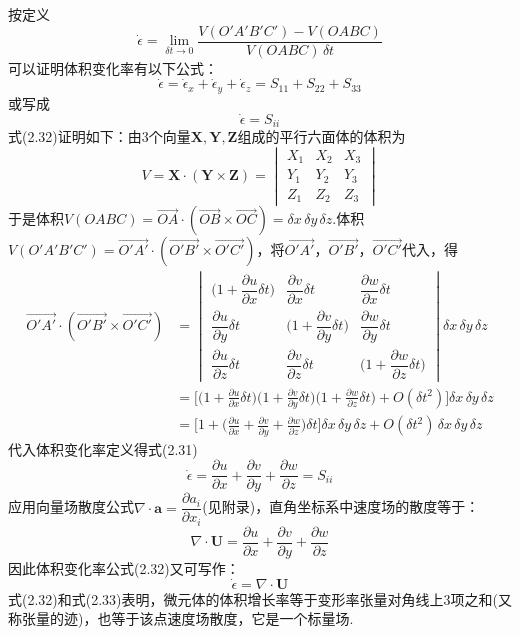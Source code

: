 按定义
\begin{equation*}
\dot{\epsilon}=\lim_{\delta t\to 0}\frac{V(O'A'B'C')-V(OABC)}{V(OABC)\,\delta t}
\tag{2.31}
\end{equation*}
可以证明体积变化率有以下公式：
\[
\dot{\epsilon}=\dot{\epsilon}_x+\dot{\epsilon}_y+\dot{\epsilon}_z=S_{11}+S_{22}+S_{33}
\]
或写成
\begin{equation*}
\dot{\epsilon}=S_{ii}
\tag{2.32}
\end{equation*}
式(2.32)证明如下：由3个向量$\boldsymbol{X},\boldsymbol{Y},\boldsymbol{Z}$组成的平行六面体的体积为
\[
V=\boldsymbol{X}\cdot(\boldsymbol{Y}\times\boldsymbol{Z})=\begin{vmatrix}
X_1 & X_2 & X_3\\
Y_1 & Y_2 & Y_3\\
Z_1 & Z_2 & Z_3
\end{vmatrix}
\]
于是体积$V(OABC)=\overrightarrow{OA}\cdot(\overrightarrow{OB}\times\overrightarrow{OC})=\delta x\,\delta y\,\delta z$.体积$V(O'A'B'C')=\overrightarrow{O'A'}\cdot(\overrightarrow{O'B'}\times\overrightarrow{O'C'})$，将$\overrightarrow{O'A'}$，$\overrightarrow{O'B'}$，$\overrightarrow{O'C'}$代入，得
\begin{align*}
\overrightarrow{O'A'}\cdot(\overrightarrow{O'B'}\times\overrightarrow{O'C'})&=\begin{vmatrix}
\Big(1+\dfrac{\partial u}{\partial x}\delta t\Big) & \dfrac{\partial v}{\partial x}\delta t & \dfrac{\partial w}{\partial x}\delta t\\[8pt]
\dfrac{\partial u}{\partial y}\delta t & \Big(1+\dfrac{\partial v}{\partial y}\delta t\Big) & \dfrac{\partial w}{\partial y}\delta t\\[8pt]
\dfrac{\partial u}{\partial z}\delta t & \dfrac{\partial v}{\partial z}\delta t & \Big(1+\dfrac{\partial w}{\partial z}\delta t\Big)
\end{vmatrix}\delta x\,\delta y\,\delta z\\[8pt]
&=\Big[\Big(1+\frac{\partial u}{\partial x}\delta t\Big)\Big(1+\frac{\partial v}{\partial y}\delta t\Big)\Big(1+\frac{\partial w}{\partial z}\delta t\Big)+O(\delta t^{2})\Big]\delta x\,\delta y\,\delta z\\
&=\Big[1+\Big(\frac{\partial u}{\partial x}+\frac{\partial v}{\partial y}+\frac{\partial w}{\partial z}\Big)\delta t\Big]\delta x\,\delta y\,\delta z+O(\delta t^{2})\,\delta x\,\delta y\,\delta z
\end{align*}
代入体积变化率定义得式(2.31)
\[
\dot{\epsilon}=\frac{\partial u}{\partial x}+\frac{\partial v}{\partial y}+\frac{\partial w}{\partial z}=S_{ii}
\]
应用向量场散度公式$\nabla\cdot\boldsymbol{a}=\dfrac{\partial a_i}{\partial x_i}$(见附录)，直角坐标系中速度场的散度等于：
\[
\nabla\cdot\boldsymbol{U}=\frac{\partial u}{\partial x}+\frac{\partial v}{\partial y}+\frac{\partial w}{\partial z}
\]
因此体积变化率公式(2.32)又可写作：
\begin{equation*}
\dot{\epsilon}=\nabla\cdot\boldsymbol{U}
\tag{2.33}
\end{equation*}
式(2.32)和式(2.33)表明，微元体的体积增长率等于变形率张量对角线上3项之和(又称张量的迹)，也等于该点速度场散度，它是一个标量场.

